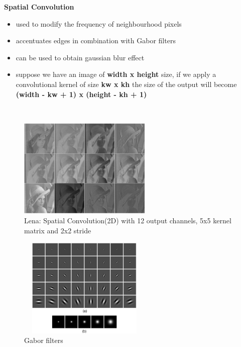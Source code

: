\textbf{Spatial Convolution}
\begin{itemize}
	\item{used to modify the frequency of neighbourhood pixels}
	\item{accentuates edges in combination with Gabor filters}
	\item{can be used to obtain gaussian blur effect}
	\item{suppose we have an image of \textbf{width x height} size, if we apply a convolutional kernel of size \textbf{kw x kh} the size of the output will become \textbf{(width - kw + 1) x (height - kh + 1)}}
\end{itemize}
~\\

\begin{figure}[h]
	\begin{center}
		\includegraphics[width=240px,height=180px]{src/img/state/lena-spatialconv22}
		\caption{Lena: Spatial Convolution(2D) with 12 output channels, 5x5 kernel matrix and 2x2 stride} \label{fig:lena-spatialconv}
    \end{center}
\end{figure}

\begin{figure}[h]
	\begin{center}
		\includegraphics[width=240px,height=180px]{src/img/state/gabor}
		\caption{Gabor filters\cite{gabor}} \label{fig:gabor.png}
    \end{center}
\end{figure}

